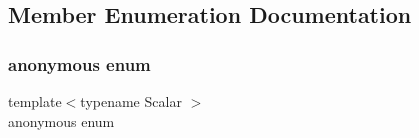\subsection{Member Enumeration Documentation}
\mbox{\label{structEigen_1_1internal_1_1functor__traits_3_01scalar__normal__dist__op_3_01Scalar_01_4_01_4_aa24d49756a42945135cf4bb233f70852}} 
\subsubsection{\texorpdfstring{anonymous enum}{anonymous enum}}
{\footnotesize\ttfamily template$<$typename Scalar $>$ \\
anonymous enum}

